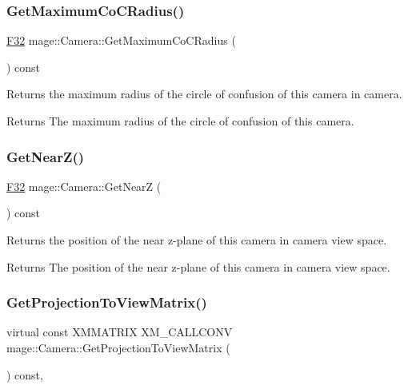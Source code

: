 \subsubsection{\texorpdfstring{Get\+Maximum\+Co\+C\+Radius()}{GetMaximumCoCRadius()}}
{\footnotesize\ttfamily \hyperlink{namespacemage_aa97e833b45f06d60a0a9c4fc22ae02c0}{F32} mage\+::\+Camera\+::\+Get\+Maximum\+Co\+C\+Radius (\begin{DoxyParamCaption}{ }\end{DoxyParamCaption}) const\hspace{0.3cm}{\ttfamily [noexcept]}}

Returns the maximum radius of the circle of confusion of this camera in camera.

\begin{DoxyReturn}{Returns}
The maximum radius of the circle of confusion of this camera. 
\end{DoxyReturn}
\hypertarget{classmage_1_1_camera_add4054d66911dd183cdec85eda77b4a1}{}\label{classmage_1_1_camera_add4054d66911dd183cdec85eda77b4a1} 
\subsubsection{\texorpdfstring{Get\+Near\+Z()}{GetNearZ()}}
{\footnotesize\ttfamily \hyperlink{namespacemage_aa97e833b45f06d60a0a9c4fc22ae02c0}{F32} mage\+::\+Camera\+::\+Get\+NearZ (\begin{DoxyParamCaption}{ }\end{DoxyParamCaption}) const\hspace{0.3cm}{\ttfamily [noexcept]}}

Returns the position of the near z-\/plane of this camera in camera view space.

\begin{DoxyReturn}{Returns}
The position of the near z-\/plane of this camera in camera view space. 
\end{DoxyReturn}
\hypertarget{classmage_1_1_camera_a9259dee9eeee754a1392cca88f428d29}{}\label{classmage_1_1_camera_a9259dee9eeee754a1392cca88f428d29} 
\subsubsection{\texorpdfstring{Get\+Projection\+To\+View\+Matrix()}{GetProjectionToViewMatrix()}}
{\footnotesize\ttfamily virtual const X\+M\+M\+A\+T\+R\+IX X\+M\+\_\+\+C\+A\+L\+L\+C\+O\+NV mage\+::\+Camera\+::\+Get\+Projection\+To\+View\+Matrix (\begin{DoxyParamCaption}{ }\end{DoxyParamCaption}) const\hspace{0.3cm}{\ttfamily [pure virtual]}, {\ttfamily [noexcept]}}

